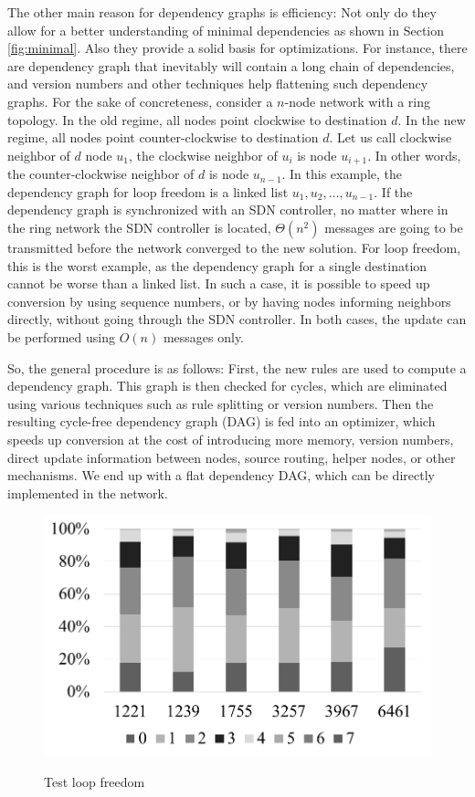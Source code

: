 The other main reason for dependency graphs is efficiency: Not only do they allow for a better understanding of minimal dependencies as shown in Section \ref{fig:minimal}. Also they provide a solid basis for optimizations. For instance, there are dependency graph that inevitably will contain a long chain of dependencies, and version numbers and other techniques help flattening such dependency graphs. For the sake of concreteness, consider a $n$-node network with a ring topology. In the old regime, all nodes point clockwise to destination $d$. In the new regime, all nodes point counter-clockwise to destination $d$. Let us call clockwise neighbor of $d$ node $u_1$, the clockwise neighbor of $u_i$ is node $u_{i+1}$. In other words, the counter-clockwise neighbor of $d$ is node $u_{n-1}$. In this example, the dependency graph for loop freedom is a linked list $u_1,u_2,\ldots,u_{n-1}$. If the dependency graph is synchronized with an SDN controller, no matter where in the ring network the SDN controller is located, $\Theta(n^2)$ messages are going to be transmitted before the network converged to the new solution. For loop freedom, this is the worst example, as the dependency graph for a single destination cannot be worse than a linked list. In such a case, it is possible to speed up conversion by using sequence numbers, or by having nodes informing neighbors directly, without going through the SDN controller. In both cases, the update can be performed using $O(n)$ messages only.

So, the general procedure is as follows: First, the new rules are used to compute a dependency graph. This graph is then checked for cycles, which are eliminated using various techniques such as rule splitting or version numbers. Then the resulting cycle-free dependency graph (DAG) is fed into an optimizer, which speeds up conversion at the cost of introducing more memory, version numbers, direct update information between nodes, source routing, helper nodes, or other mechanisms. We end up with a flat dependency DAG, which can be directly implemented in the network.

\begin{figure}[t!]
  \centering
  \includegraphics[width=\columnwidth]{figures/as.png}\\
  \caption{Test loop freedom}\label{fig:as}
\end{figure}

